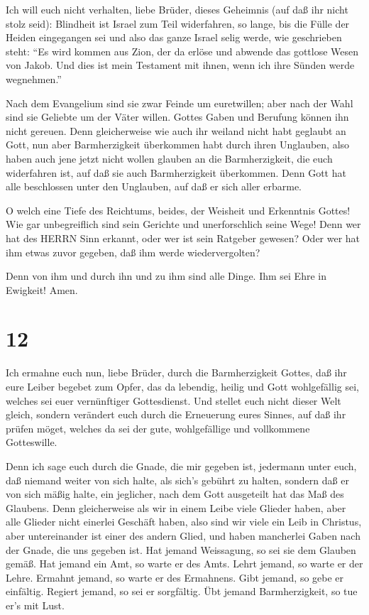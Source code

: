  Ich will euch nicht verhalten, liebe Brüder, dieses
Geheimnis (auf daß ihr nicht stolz seid): Blindheit ist Israel zum Teil
widerfahren, so lange, bis die Fülle der Heiden eingegangen sei
 und also das ganze Israel selig werde, wie geschrieben
steht: ``Es wird kommen aus Zion, der da erlöse und abwende das gottlose
Wesen von Jakob.  Und dies ist mein Testament mit ihnen,
wenn ich ihre Sünden werde wegnehmen.''

 Nach dem Evangelium sind sie zwar Feinde um euretwillen;
aber nach der Wahl sind sie Geliebte um der Väter willen. 
Gottes Gaben und Berufung können ihn nicht gereuen.  Denn
gleicherweise wie auch ihr weiland nicht habt geglaubt an Gott, nun aber
Barmherzigkeit überkommen habt durch ihren Unglauben,  also
haben auch jene jetzt nicht wollen glauben an die Barmherzigkeit, die
euch widerfahren ist, auf daß sie auch Barmherzigkeit überkommen.
 Denn Gott hat alle beschlossen unter den Unglauben, auf
daß er sich aller erbarme.

 O welch eine Tiefe des Reichtums, beides, der Weisheit und
Erkenntnis Gottes! Wie gar unbegreiflich sind sein Gerichte und
unerforschlich seine Wege!  Denn wer hat des HERRN Sinn
erkannt, oder wer ist sein Ratgeber gewesen?  Oder wer hat
ihm etwas zuvor gegeben, daß ihm werde wiedervergolten?

 Denn von ihm und durch ihn und zu ihm sind alle Dinge. Ihm
sei Ehre in Ewigkeit! Amen.

\hypertarget{section-11}{%
\section{12}\label{section-11}}

 Ich ermahne euch nun, liebe Brüder, durch die
Barmherzigkeit Gottes, daß ihr eure Leiber begebet zum Opfer, das da
lebendig, heilig und Gott wohlgefällig sei, welches sei euer
vernünftiger Gottesdienst.  Und stellet euch nicht dieser
Welt gleich, sondern verändert euch durch die Erneuerung eures Sinnes,
auf daß ihr prüfen möget, welches da sei der gute, wohlgefällige und
vollkommene Gotteswille.

 Denn ich sage euch durch die Gnade, die mir gegeben ist,
jedermann unter euch, daß niemand weiter von sich halte, als sich's
gebührt zu halten, sondern daß er von sich mäßig halte, ein jeglicher,
nach dem Gott ausgeteilt hat das Maß des Glaubens.  Denn
gleicherweise als wir in einem Leibe viele Glieder haben, aber alle
Glieder nicht einerlei Geschäft haben,  also sind wir viele
ein Leib in Christus, aber untereinander ist einer des andern Glied,
 und haben mancherlei Gaben nach der Gnade, die uns gegeben
ist.  Hat jemand Weissagung, so sei sie dem Glauben gemäß.
Hat jemand ein Amt, so warte er des Amts. Lehrt jemand, so warte er der
Lehre.  Ermahnt jemand, so warte er des Ermahnens. Gibt
jemand, so gebe er einfältig. Regiert jemand, so sei er sorgfältig. Übt
jemand Barmherzigkeit, so tue er's mit Lust.

